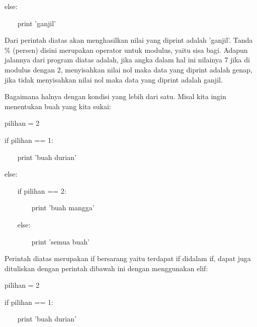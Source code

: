 \noindent 
else: \par
\vspace{12pt}
\noindent 
~~~ print 'ganjil' \par
\vspace{12pt}
\noindent 
Dari perintah diatas akan menghasilkan nilai yang diprint adalah 'ganjil'. Tanda $  $ $  \%  $ $  $(persen) disini merupakan operator untuk modulus, yaitu sisa bagi. Adapun jalannya dari program diatas adalah, jika angka dalam hal ini nilainya 7 jika di modulus dengan 2, menyisahkan nilai nol maka data yang diprint adalah genap, jika tidak menyisahkan nilai nol maka data yang diprint adalah ganjil. \par
\vspace{12pt}
\noindent 
Bagaimana halnya dengan kondisi yang lebih dari satu. Misal kita ingin menentukan buah yang kita sukai: \par
\vspace{12pt}
\noindent 
pilihan = 2 \par
\vspace{12pt}
\noindent 
if pilihan == 1: \par
\vspace{12pt}
\noindent 
~~~ print 'buah durian' \par
\vspace{12pt}
\noindent 
else: \par
\vspace{12pt}
\noindent 
~~~ if pilihan == 2: \par
\vspace{12pt}
\noindent 
~~~~~~~ print 'buah mangga' \par
\vspace{12pt}
\noindent 
~~~ else: \par
\vspace{12pt}
\noindent 
~~~~~~~ print 'semua buah' \par
\vspace{12pt}
\noindent 
Perintah diatas merupakan if bersarang yaitu terdapat if didalam if, dapat juga dituliskan dengan perintah dibawah ini dengan menggunakan $  $elif: \par
\vspace{12pt}
\noindent 
pilihan = 2 \par
\vspace{12pt}
\noindent 
if pilihan == 1: \par
\vspace{12pt}
\noindent 
~~~ print 'buah durian' \par
\vspace{12pt}
